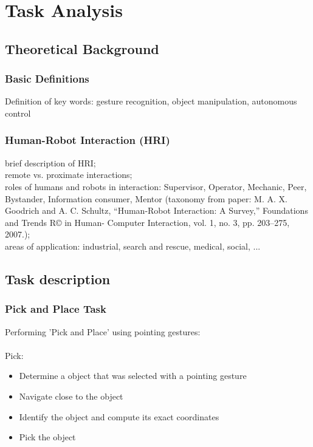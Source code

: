 \chapter{Task Analysis}


\section{Theoretical Background}

\subsection{Basic Definitions}
Definition of key words:
gesture recognition, object manipulation, autonomous control

\subsection{Human-Robot Interaction (HRI)}
brief description of HRI; \\

remote vs. proximate interactions; \\

roles of humans and robots in interaction: Supervisor, Operator, Mechanic, Peer, Bystander, Information consumer, Mentor (taxonomy from paper: M. A. X. Goodrich and A. C. Schultz, “Human-Robot Interaction: A Survey,” Foundations and Trends R© in Human- Computer Interaction, vol. 1, no. 3, pp. 203–275, 2007.); \\

areas of application: industrial, search and rescue, medical, social, ...\\

\section{Task description}
\subsection{Pick and Place Task}

Performing 'Pick and Place' using pointing gestures:\\ \\
Pick:\\
\begin{itemize}
\item {Determine a object that was selected with a pointing gesture}
\item {Navigate close to the object}
\item {Identify the object and compute its exact coordinates}
\item {Pick the object}
\end{itemize}


